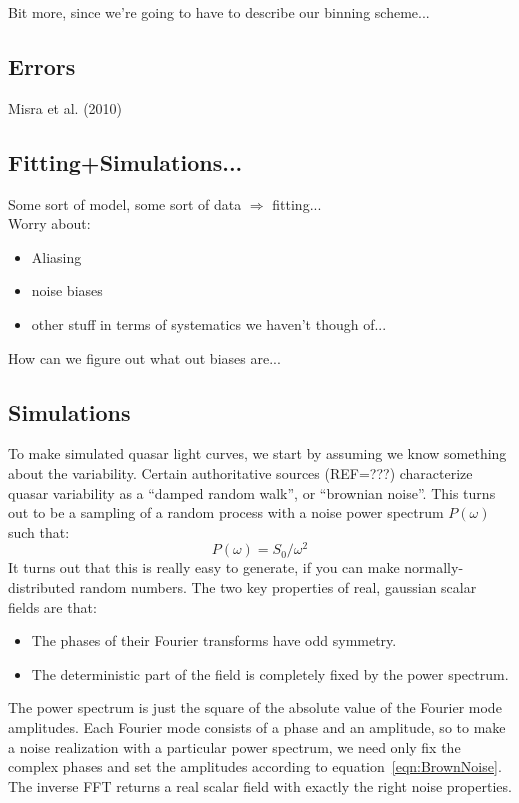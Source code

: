 \documentclass[11pt,a4paper]{article}
\begin{document}
    Bit more, since we're going to have to describe our binning scheme...\\
    
    \subsection{Errors}
    Misra et al. (2010) 

    \subsection{Fitting+Simulations...}
    Some sort of model, some sort of data $\Rightarrow$ fitting... \\
    Worry about: 
    \begin{itemize}
      \item{Aliasing}
      \item{noise biases} 
      \item{other stuff in terms of systematics we haven't though of...}
    \end{itemize}
    How can we figure out what out biases are...

    \subsection{Simulations}
    To make simulated quasar light curves, we start by assuming we
    know something about the variability. Certain authoritative
    sources (REF=???) characterize quasar variability as a ``damped
    random walk'', or ``brownian noise''. This turns out to be a
    sampling of a random process with a noise power spectrum $P(\omega)$
    such that:
    \begin{equation}
      P(\omega) = S_0/\omega^2
      \label{eqn:BrownNoise}
    \end{equation}
    It turns out that this is really easy to generate, if you can make
    normally-distributed random numbers. The two key properties of real, gaussian
    scalar fields are that:
    \begin{itemize}
    \item The phases of their Fourier transforms have odd symmetry.
    \item The deterministic part of the field is completely fixed by
      the power spectrum.
    \end{itemize}
    The power spectrum is just the square of the absolute value of the
    Fourier mode amplitudes. Each Fourier mode consists of a phase and
    an amplitude, so to make a noise realization with a particular
    power spectrum, we need only fix the complex phases and set the
    amplitudes according to equation~\ref{eqn:BrownNoise}. The inverse
    FFT returns a real scalar field with exactly the right noise
    properties.
    
\end{document}
